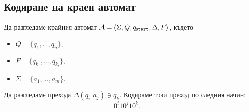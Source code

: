 






\subsection{Кодиране на краен автомат}

Да разгледаме крайния автомат $\mathcal{A} = \langle{\Sigma,Q,q_{\texttt{start}},\Delta,F}\rangle$, където 
\begin{itemize}
\item 
  $Q = \{q_1,\dots,q_n\}$,
\item
  $F = \{q_{k_1},\dots,q_{k_l}\}$,
\item
  $\Sigma = \{a_1,\dots,a_m\}$.
\end{itemize}
Да разгледаме прехода $\Delta(q_i,a_j) \ni q_k$.
Кодираме този преход по следния начин:
\[0^i10^j10^k.\]

